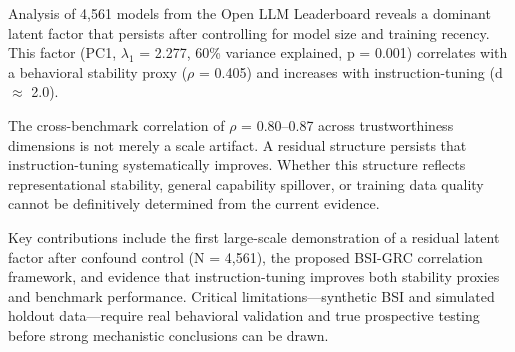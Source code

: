 
Analysis of 4,561 models from the Open LLM Leaderboard reveals a dominant latent factor that persists after controlling for model size and training recency. This factor (PC1, $\lambda _1$ = 2.277, 60\% variance explained, p = 0.001) correlates with a behavioral stability proxy ($\rho$ = 0.405) and increases with instruction-tuning (d $\approx$ 2.0).

The cross-benchmark correlation of $\rho$ = 0.80--0.87 across trustworthiness dimensions is not merely a scale artifact. A residual structure persists that instruction-tuning systematically improves. Whether this structure reflects representational stability, general capability spillover, or training data quality cannot be definitively determined from the current evidence.

Key contributions include the first large-scale demonstration of a residual latent factor after confound control (N = 4,561), the proposed BSI-GRC correlation framework, and evidence that instruction-tuning improves both stability proxies and benchmark performance. Critical limitations---synthetic BSI and simulated holdout data---require real behavioral validation and true prospective testing before strong mechanistic conclusions can be drawn.
